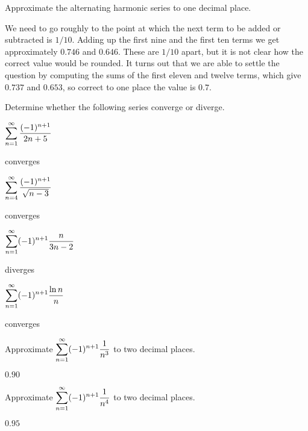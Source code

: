\begin{example}
Approximate the alternating harmonic series to one decimal place.
\end{example}
\begin{solution}
We need to go roughly to the point at which the next term to be added
or subtracted is $1/10$. Adding up the first nine and the first ten
terms we get approximately $0.746$ and $0.646$. These are $1/10$
apart, but it is not clear how the correct value would be rounded. It
turns out that we are able to settle the question by computing the
sums of the first eleven and twelve terms, which give
$0.737$ and $0.653$, so correct to one place the value is $0.7$.
\end{solution}


\begin{exercises}

Determine whether the following series converge or diverge.

\twocol

\begin{exercise} $\displaystyle\sum_{n=1}^\infty {(-1)^{n+1}\over 2n+5}$
\begin{answer} converges
\end{answer}\end{exercise}

\begin{exercise} $\displaystyle\sum_{n=4}^\infty {(-1)^{n+1}\over \sqrt{n-3}}$
\begin{answer} converges
\end{answer}\end{exercise}

\begin{exercise} $\displaystyle\sum_{n=1}^\infty (-1)^{n+1}{n\over 3n-2}$
\begin{answer} diverges
\end{answer}\end{exercise}

\begin{exercise} $\displaystyle\sum_{n=1}^\infty (-1)^{n+1}{\ln n\over n}$
\begin{answer} converges
\end{answer}\end{exercise}
\endtwocol

\begin{exercise} Approximate $\displaystyle\sum_{n=1}^\infty (-1)^{n+1}{1\over n^3}$ to
two decimal places.
\begin{answer} $0.90$
\end{answer}\end{exercise}

\begin{exercise} Approximate $\displaystyle\sum_{n=1}^\infty (-1)^{n+1}{1\over n^4}$ to
two decimal places. 
\begin{answer} $0.95$
\end{answer}\end{exercise}

\end{exercises}

